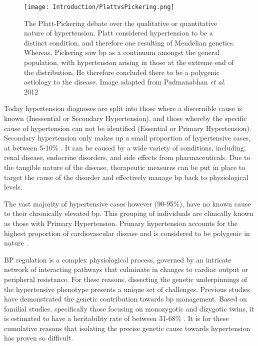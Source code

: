 \begin{figure*}[!htbp]
\centering
\texttt{[image: Introduction/PlattvsPickering.png]}
\caption[The Platt-Pickering debate over the qualitative or quantitative nature of hypertension]{The Platt-Pickering debate over the qualitative or quantitative nature of hypertension. Platt considered hypertension to be a distinct condition, and therefore one resulting of Mendelian genetics. Whereas, Pickering saw \acrfull{bp} as a continuum amongst the general population, with hypertension arising in those at the extreme end of the distribution. He therefore concluded there to be a polygenic aetiology to the disease. Image adapted from Padmanabhan \textit{et al.} 2012 \cite{PADMANABHAN2012397}}
\label{fig:plattvspickering}
\end{figure*}

Today hypertension diagnoses are split into those where a discernible cause is known (Inessential or Secondary Hypertension), and those whereby the specific cause of hypertension can not be identified (Essential or Primary Hypertension). Secondary hypertension only makes up a small proportion of hypertensive cases, at between 5-10\% \cite{Chobanian2003,Omura2004,Vongpatanasin2014}. It can be caused by a wide variety of conditions, including; renal disease, endocrine disorders, and side effects from pharmaceuticals. Due to the tangible nature of the disease, therapeutic measures can be put in place to target the cause of the disorder and effectively manage \acrshort{bp} back to physiological levels. 

The vast majority of hypertensive cases however (90-95\%), have no known cause to their chronically elevated \acrshort{bp}. This grouping of individuals are clinically known as those with Primary Hypertension. Primary hypertension accounts for the highest proportion of cardiovascular disease and is considered to be polygenic in nature \cite{Cowley2006}.

BP regulation is a complex physiological process, governed by an intricate network of interacting pathways that culminate in changes to cardiac output or peripheral resistance. For these reasons, dissecting the genetic underpinnings of the hypertensive phenotype presents a unique set of challenges. Previous studies have demonstrated the genetic contribution towards \acrshort{bp} management. Based on familial studies, specifically those focusing on monozygotic and dizygotic twins, it is estimated to have a heritability rate of between 31-68\% \cite{Hottenga2005,Kupper2005}. It is for these cumulative reasons that isolating the precise genetic cause towards hypertension has proven so difficult. 



